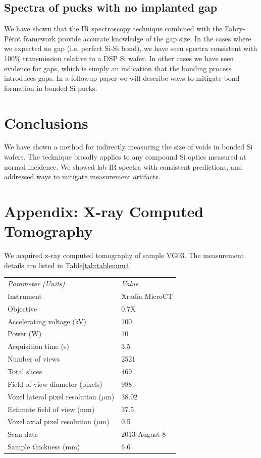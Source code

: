 \documentclass[osajnl,preprint,showpacs,superscriptaddress,12pt]{revtex4-1} %
\begin{document}
\subsection{Spectra of pucks with no implanted gap}
We have shown that the IR spectroscopy technique combined with the Fabry-P\'{e}rot framework provide accurate knowledge of the gap size.  In the cases where we expected no gap (i.e. perfect Si-Si bond), we have seen spectra consistent with 100\% transmission relative to a DSP Si wafer.  In other cases we have seen evidence for gaps, which is simply an indication that the bonding process introduces gaps.  In a followup paper we will describe ways to mitigate bond formation in bonded Si pucks.

\section{Conclusions}
We have shown a method for indirectly measuring the size of voids in bonded Si wafers.  The technique broadly applies to any compound Si optics measured at normal incidence.  We showed lab IR spectra with consistent predictions, and addressed ways to mitigate measurement artifacts. 

\appendix

\section{Appendix: X-ray Computed Tomography}
We acquired x-ray computed tomography of sample VG03.  The measurement details are listed in Table\ref{tab:tablenum4}.


\begin{center}
    \begin{tabular}{ll}
    \emph{Parameter (Units)} & \emph{Value} \\ 
    Instrument& Xradia MicroCT \\
     Objective & 0.7X \\
    Accelerating voltage (kV) & 100 \\
        Power (W) & 10 \\
        Acquisition time (s) & 3.5 \\
        Number of views & 2521 \\
        Total slices & 469 \\
        Field of view diameter (pixels) & 988 \\
        Voxel lateral pixel resolution ($\mu$m) & 38.02 \\
        Estimate field of view (mm) & 37.5 \\
        Voxel axial pixel resolution ($\mu$m) & 0.5 \\
        Scan date & 2013 August 8 \\
        Sample thickness (mm) & 6.6 \\
     \end{tabular}
\end{center}
\end{document}
